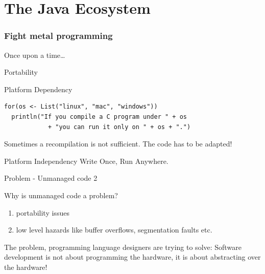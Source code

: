 \part[The Java Ecosystem]{The Java Ecosystem}
\section{Fight metal programming}

\begin{frame}{Once upon a time\ldots}
\end{frame}

\begin{frame}[fragile]{Portability}
\begin{alertblock}{Platform Dependency}
\begin{lstlisting}
for(os <- List("linux", "mac", "windows"))
  println("If you compile a C program under " + os
            + "you can run it only on " + os + ".")
\end{lstlisting}
\end{alertblock}
\pause
Sometimes a recompilation is not sufficient. \alert{The code} has to be adapted!
\pause
\begin{block}{Platform Independency}
Write Once, Run Anywhere.
\end{block}
\end{frame}


\begin{frame}{Problem - Unmanaged code 2}
\begin{block}{Why is unmanaged code a problem?}
\begin{enumerate}
  \pause
  \item portability issues
  \pause
  \item low level hazards like buffer overflows, segmentation faults etc.
\end{enumerate}
\end{block}
\pause
\begin{alertblock}{The problem, programming language designers are trying to
solve:} Software development is not about programming the hardware, it is about
abstracting over the hardware!
\end{alertblock}
\end{frame}

